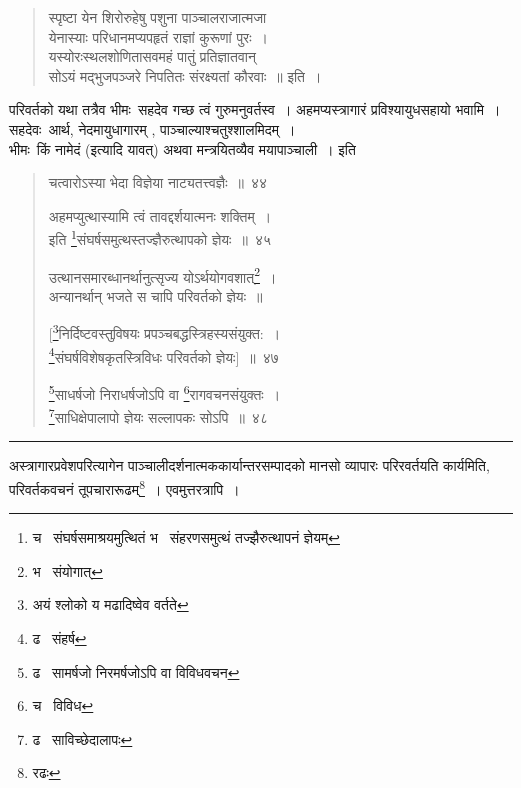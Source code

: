\documentclass[11pt, openany]{book}
\begin{document}
\begin{quote}
{\qt स्पृष्टा येन शिरोरुहेषु पशुना पाञ्चालराजात्मजा\\
येनास्याः परिधानमप्यपहृतं राज्ञां कुरूणां पुरः~।\\
यस्योरःस्थलशोणितासवमहं पातुं प्रतिज्ञातवान्\\
सोऽयं मद्भुजपञ्जरे निपतितः संरक्ष्यतां कौरवाः~॥} इति~।
\end{quote}

\noindent
परिवर्तको यथा तत्रैव भीमः\textendash\ सहदेव गच्छ त्वं गुरुमनुवर्तस्व~। अहमप्यस्त्रागारं प्रविश्यायुधसहायो भवामि~।\\

सहदेवः\textendash\ आर्थ, नेदमायुधागारम् , पाञ्चाल्याश्चतुश्शालमिदम्~। \\

भीमः\textendash\ किं नामेदं (इत्यादि यावत्) अथवा मन्त्रयितव्यैव मयापाञ्चाली~। इति


\newpage
\lfoot{}

\begin{quote}
{\na चत्वारोऽस्या भेदा विज्ञेया नाट्यतत्त्वज्ञैः~॥~४४

अहमप्युत्थास्यामि त्वं तावद्दर्शयात्मनः शक्तिम्~।\\
इति \renewcommand{\thefootnote}{1}\footnote{च \textendash\ संघर्षसमाश्रयमुत्थितं भ \textendash\ संहरणसमुत्थं तज्झैरुत्थापनं ज्ञेयम्}संघर्षसमुत्थस्तज्ज्ञैरुत्थापको ज्ञेयः~॥~४५

उत्थानसमारब्धानर्थानुत्सृज्य योऽर्थयोगवशात्\renewcommand{\thefootnote}{2}\footnote{भ \textendash\ संयोगात्}~।\\
अन्यानर्थान् भजते स चापि परिवर्तको ज्ञेयः~॥

[\renewcommand{\thefootnote}{3}\footnote{अयं श्लोको य मढादिष्वेव वर्तते}निर्दिष्टवस्तुविषयः प्रपञ्चबद्धस्त्रिहस्यसंयुक्त:~।\\
\renewcommand{\thefootnote}{4}\footnote{ढ \textendash\ संहर्ष}संघर्षविशेषकृतस्त्रिविधः परिवर्तको ज्ञेयः]~॥~४७

\renewcommand{\thefootnote}{5}\footnote{ढ \textendash\ सामर्षजो निरमर्षजोऽपि वा विविधवचन}साधर्षजो निराधर्षजोऽपि वा \renewcommand{\thefootnote}{6}\footnote{च \textendash\ विविध}रागवचनसंयुक्तः~।\\
\renewcommand{\thefootnote}{7}\footnote{ढ \textendash\ साविच्छेदालापः}साधिक्षेपालापो ज्ञेयः सल्लापकः सोऽपि~॥~४८}
\end{quote}

\hrule

\vspace{2mm}
अस्त्रागारप्रवेशपरित्यागेन पाञ्चालीदर्शनात्मककार्यान्तरसम्पादको मानसो व्यापारः परिरवर्तयति कार्यमिति, परिवर्तकवचनं तूपचारारूढम्\renewcommand{\thefootnote}{1}\footnote{रढः}~। एवमुत्तरत्रापि~।\\
\end{document}
